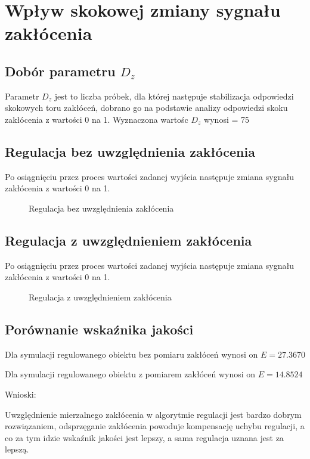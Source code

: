 \section{Wpływ skokowej zmiany sygnału zakłócenia}
\label{projekt:zad5}

\subsection{Dobór parametru $D_z$}
\label{projekt:zad5:Dz}

Parametr $D_{z}$ jest to liczba próbek, dla której następuje stabilizacja odpowiedzi skokowych toru zakłóceń, 
dobrano go na podstawie analizy odpowiedzi skoku
zakłócenia z wartości \num{0} na \num{1}.
Wyznaczona wartośc $D_{z}$ wynosi = \num{75}

\subsection{Regulacja bez uwzględnienia zakłócenia}
\label{projekt:zad5:regulacjaBezUwzg}

Po osiągnięciu przez proces wartości zadanej wyjścia następuje zmiana sygnału
zakłócenia z wartości \num{0} na \num{1}.

\begin{figure}[H] 
    \centering
    
    \caption{Regulacja bez uwzględnienia zakłócenia}
    \label{projekt:zad5:regulacjaBezUwzgZ:figure}
\end{figure}

\newpage

\subsection{Regulacja z uwzględnieniem zakłócenia}
\label{projekt:zad5:regulacjaZUwzg}

Po osiągnięciu przez proces wartości zadanej wyjścia następuje zmiana sygnału
zakłócenia z wartości \num{0} na \num{1}.

\begin{figure}[H] 
    \centering
    
    \caption{Regulacja z uwzględnieniem zakłócenia}
    \label{projekt:zad5:regulacjaUwzgZ:figure}
\end{figure}

\subsection{Porównanie wskaźnika jakości}
\label{projekt:zad5:porownanie}

Dla symulacji regulowanego obiektu bez pomiaru zakłóceń wynosi on $E=27.3670$

Dla symulacji regulowanego obiektu z pomiarem zakłóceń wynosi on $E=14.8524$

Wnioski: 

Uwzględnienie mierzalnego zakłócenia w algorytmie regulacji jest bardzo dobrym rozwiązaniem, 
odsprzęganie zakłócenia powoduje kompensację uchybu regulacji, 
a co za tym idzie wskaźnik jakości jest lepszy, 
a sama regulacja uznana jest za lepszą.

\newpage
